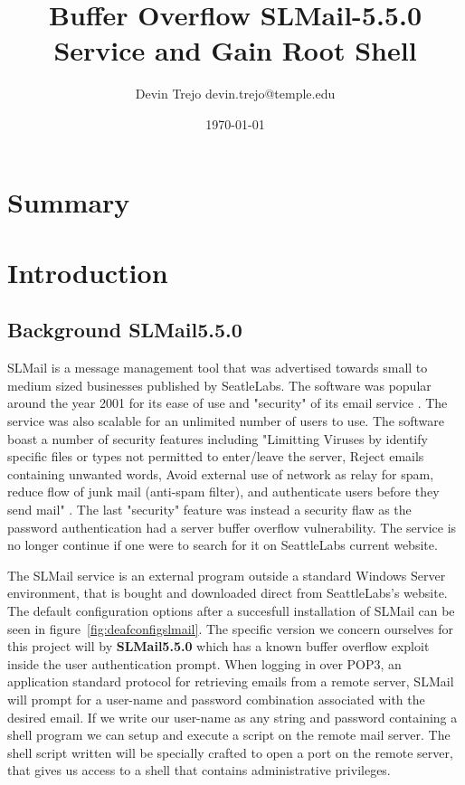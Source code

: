 \documentclass[12pt]{article}
\begin{document}
\title{Buffer Overflow SLMail-5.5.0 Service and Gain Root Shell}
\author{Devin Trejo \tabularnewline devin.trejo@temple.edu}
\date{\today}
\maketitle

\section{Summary}
\label{sect:summary}


\section{Introduction}
\label{sect:intro}
\subsection{Background SLMail5.5.0}
\label{sec:background}
SLMail is a message management tool that was advertised towards small to 
medium sized businesses published by SeatleLabs. The software was popular 
around the year 2001 for its ease of use and "security" of its email 
service \cite{SeattleLabs2001}. The service was also scalable for an 
unlimited number of users to use. The software boast a number of security 
features including "Limitting Viruses by identify specific files or types 
not permitted to enter/leave the server, Reject emails containing unwanted 
words, Avoid external use of network as relay for spam, reduce flow of 
junk mail (anti-spam filter), and authenticate users before they send 
mail" \cite{SeattleLabs2001}. The last "security" feature was instead a 
security flaw as the password authentication had a server buffer overflow 
vulnerability. The service is no longer continue if one were to search for 
it on SeattleLabs current website. 

The SLMail service is an external program outside a standard Windows Server 
environment, that is bought and downloaded direct from SeattleLabs's website.
The default configuration options after a succesfull installation of SLMail
can be seen in figure~\ref{fig:deafconfigslmail}. The specific version we 
concern ourselves for this project will by \textbf{SLMail5.5.0} which has a 
known buffer overflow exploit inside the user authentication prompt. When 
logging in over POP3, an application standard protocol for retrieving 
emails from a remote server, SLMail will prompt for a user-name and 
password combination associated with the desired email. If we write our 
user-name as any string and password containing a shell program we can 
setup and execute a script on the remote mail server. The shell script 
written will be specially crafted to open a port on the remote server, 
that gives us access to a shell that contains administrative privileges. 
\end{document}
